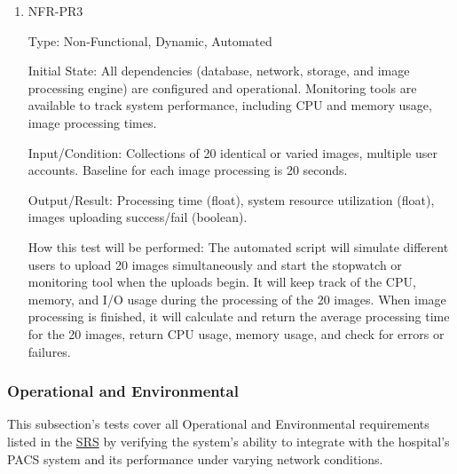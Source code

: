 \documentclass[12pt, titlepage]{article}
\begin{document}
\begin{enumerate}
\item{NFR-PR3\\}\label{NFR-PR3}

Type: Non-Functional, Dynamic, Automated

Initial State: All dependencies (database, network, storage, and image processing engine) are configured and operational. Monitoring tools are available to track system performance, including CPU and memory usage, image processing times.

Input/Condition: Collections of 20 identical or varied images, multiple user accounts. Baseline for each image processing is 20 seconds.

Output/Result: Processing time (float), system resource utilization (float), images uploading success/fail (boolean).

How this test will be performed: The automated script will simulate different users to upload 20 images simultaneously and start the stopwatch or monitoring tool when the uploads begin. It will keep track of the CPU, memory, and I/O usage during the processing of the 20 images. When image processing is finished, it will calculate and return the average processing time for the 20 images, return CPU usage, memory usage, and check for errors or failures.

\end{enumerate}

\subsubsection{Operational and Environmental}

This subsection's tests cover all Operational and Environmental requirements listed in the \href{https://github.com/RezaJodeiri/CXR-Capstone/blob/main/docs/SRS/SRS.pdf}{SRS} \citep{SRS}
 by verifying the system's ability to integrate with the hospital's PACS system and its performance under varying network conditions.
\end{document}
